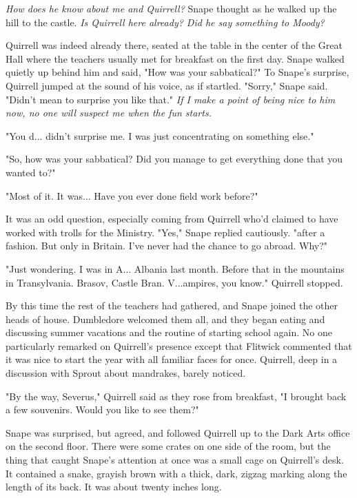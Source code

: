 \emph{How does he know about me and Quirrell?} Snape thought as he walked up the hill to the castle. \emph{Is Quirrell here already? Did he say something to Moody?}

Quirrell was indeed already there, seated at the table in the center of the Great Hall where the teachers usually met for breakfast on the first day. Snape walked quietly up behind him and said, "How was your sabbatical?" To Snape's surprise, Quirrell jumped at the sound of his voice, as if startled. "Sorry," Snape said. "Didn't mean to surprise you like that." \emph{If I make a point of being nice to him now, no one will suspect me when the fun starts.}

"You d... didn't surprise me. I was just concentrating on something else."

"So, how was your sabbatical? Did you manage to get everything done that you wanted to?"

"Most of it. It was... Have you ever done field work before?"

It was an odd question, especially coming from Quirrell who'd claimed to have worked with trolls for the Ministry. "Yes," Snape replied cautiously. "after a fashion. But only in Britain. I've never had the chance to go abroad. Why?"

"Just wondering. I was in A... Albania last month. Before that in the mountains in Transylvania. Brasov, Castle Bran. V...ampires, you know." Quirrell stopped.

By this time the rest of the teachers had gathered, and Snape joined the other heads of house. Dumbledore welcomed them all, and they began eating and discussing summer vacations and the routine of starting school again. No one particularly remarked on Quirrell's presence except that Flitwick commented that it was nice to start the year with all familiar faces for once. Quirrell, deep in a discussion with Sprout about mandrakes, barely noticed.

"By the way, Severus," Quirrell said as they rose from breakfast, "I brought back a few souvenirs. Would you like to see them?"

Snape was surprised, but agreed, and followed Quirrell up to the Dark Arts office on the second floor. There were some crates on one side of the room, but the thing that caught Snape's attention at once was a small cage on Quirrell's desk. It contained a snake, grayish brown with a thick, dark, zigzag marking along the length of its back. It was about twenty inches long.

